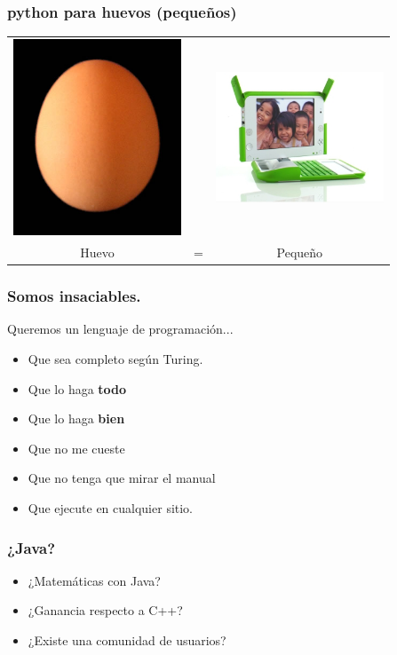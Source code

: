 \documentclass{beamer}
\begin{document}

\begin{frame}
 \frametitle{python para huevos (pequeños)}
  \begin{center}
 \begin{tabular}[h]{ccc}
   \includegraphics[width=5cm]{files/huevo.jpg} & &
   \includegraphics[width=5cm]{files/nigerian-machine.jpg}\\
   Huevo & = &Pequeño
 \end{tabular}
\end{center}
\end{frame}

\begin{frame}
  \frametitle{Somos insaciables.}
Queremos un lenguaje de programación...
  \begin{itemize}
  \item Que sea completo según Turing.
  \item Que lo haga \textbf{todo}
  \item Que lo haga \textbf{bien}
  \item Que no me cueste
  \item Que no tenga que mirar el manual
  \item Que ejecute en cualquier sitio.
  \end{itemize}
\end{frame}

\begin{frame}
  \frametitle{¿Java?}
  \begin{itemize}
  \item ¿Matemáticas con Java?
  \item ¿Ganancia respecto a C++?
  \item ¿Existe una comunidad de usuarios?
  \end{itemize}
\end{frame}
\end{document}
